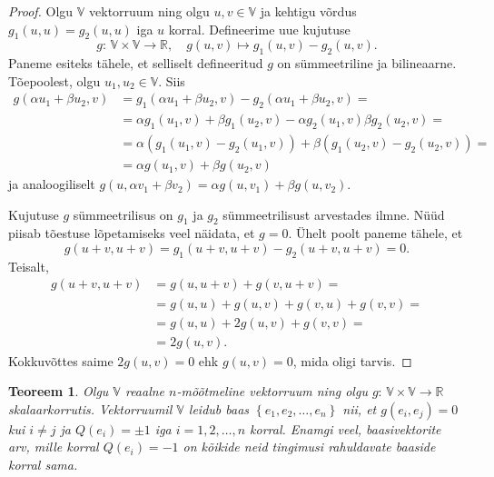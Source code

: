 \documentclass[12pt,a4paper,oneside]{article}
\theoremstyle{plain}
\newtheorem{teoreem}{Teoreem}[section]
\theoremstyle{definition}
\numberwithin{equation}{section}
\def\R{{\mathbb R}}
\def\V{{\mathbb V}}
\begin{document}
\begin{proof}
Olgu $\V$ vektorruum ning olgu $u, v \in \V$ ja 
kehtigu võrdus $g_1 \left(u, u\right) = g_2 \left(u, u\right)$ 
iga $u$ korral. Defineerime uue kujutuse
\begin{equation*}
g \colon\, \V \times \V \rightarrow \R, \quad 
g\left(u, v\right) \mapsto g_1\left(u, v\right) - g_2\left(u, v\right).
\end{equation*}
Paneme esiteks tähele, et selliselt defineeritud $g$ on 
sümmeetriline ja bilineaarne. Tõepoolest, olgu 
$u_1, u_2 \in \V$. Siis
\begin{align*}
g\left( \alpha u_1 + \beta u_2, v \right) &= 
g_1\left( \alpha u_1 + \beta u_2, v \right) - 
g_2\left( \alpha u_1 + \beta u_2, v \right) = \\
&= \alpha g_1 \left(u_1, v\right) + 
\beta g_1 \left(u_2, v \right) -\alpha g_2 
\left(u_1, v\right)  \beta g_2 \left(u_2, v \right) = \\
&= \alpha \left( g_1 \left(u_1, v\right) - 
g_2 \left(u_1, v \right)\right) + \beta 
\left( g_1 \left(u_2, v\right) - g_2 \left(u_2, v \right)\right) = \\
&= \alpha g\left( u_1, v \right) + \beta g\left( u_2, v\right) 
\end{align*}
ja analoogiliselt $g\left( u, \alpha v_1 + \beta v_2 \right) = 
\alpha g\left( u, v_1 \right) + \beta g\left( u, v_2\right)$.

Kujutuse $g$ sümmeetrilisus on $g_1$ ja $g_2$ sümmeetrilisust 
arvestades ilmne. Nüüd piisab tõestuse lõpetamiseks veel näidata, et 
$g = 0$. Ühelt poolt paneme tähele, et
\begin{equation*}
g \left(u+v, u+v\right) = g_1 \left(u+v, u+v\right) - 
g_2 \left(u+v, u+v\right) = 0.
\end{equation*}
Teisalt,
\begin{align*}
g \left(u+v, u+v\right) &= g \left(u, u+v\right) + 
g \left(v, u+v\right) = \\
&= g \left(u, u\right) + g \left(u, v\right) + 
g \left(v, u\right) + g \left(v, v\right) = \\
&= g \left(u, u\right) + 2g \left(u, v\right) + 
g \left(v, v\right) = \\
&= 2g \left(u, v\right).
\end{align*}
Kokkuvõttes saime $2g\left(u, v\right) = 0$ ehk 
$g\left(u, v\right) = 0$, mida oligi tarvis.
\end{proof}

\begin{teoreem} \label{teoreem:ortbaas}
Olgu $\V$ reaalne $n$-mõõtmeline vektorruum ning olgu 
$g \colon\, \V \times \V \rightarrow \R$ skalaarkorrutis. 
Vektorruumil $\V$ leidub baas 
$\left\lbrace e_1, e_2, \dots, e_n \right\rbrace$ nii, et 
$g \left(e_i, e_j\right) = 0$ kui $i \neq j$ ja 
$Q\left(e_i\right) = \pm 1$ iga $i = 1, 2, \dots, n$ korral. Enamgi 
veel, baasivektorite arv, mille korral $Q \left(e_i\right) = -1$ on 
kõikide neid tingimusi rahuldavate baaside korral sama.
\end{teoreem}
\end{document}
